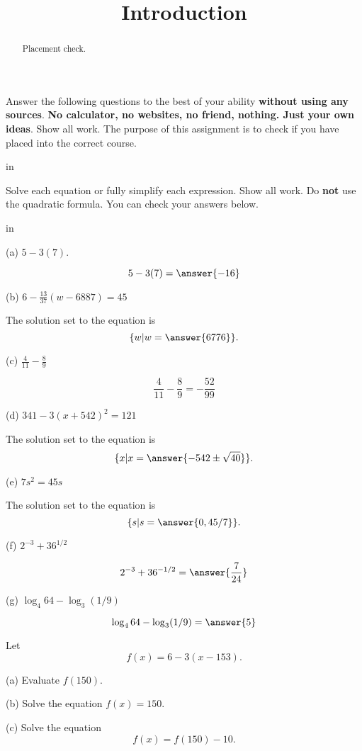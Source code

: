 \documentclass{ximera}
\title{Introduction}
\newcommand{\pskip}{\vskip 0.1 in}
\begin{document}
\begin{abstract}
Placement check. 
\end{abstract}
\maketitle


Answer the following questions to the best of your ability {\bf without using any sources}. {\bf No calculator, no websites, no friend, nothing. Just your own ideas}. Show all work. The purpose of this assignment is to check if you have placed into the correct course. 

\pskip

\begin{question}  \label{Q9df934gmmn}
Solve each equation or fully simplify each expression. Show all work. Do {\bf not} use the quadratic formula. You can check your answers below.

\pskip

(a) $ 5 - 3(7)$.  

\[
       5 - 3(7) =  \answer{-16}
\]

(b) $6 - \frac{13}{37} \left(  w - 6887 \right) = 45$

The solution set to the equation is
\[
    \{w | w= \answer{6776} \} .
\]

(c) $\frac{4}{11} - \frac{8}{9}$

\[
    \frac{4}{11} - \frac{8}{9} = -\frac{52}{99} 
\]

(d) $341 - 3 (x+542)^2 =121$

The solution set to the equation is
\[
       \{x | x= \answer{-542 \pm \sqrt{40}} \}.
\]

(e) $7s^2 = 45s $

The solution set to the equation is
\[
       \{s | s= \answer{0, 45/7} \}.
\]

(f) $2^{-3} + 36^{1/2}$

\[
     2^{-3} + 36^{-1/2} = \answer{\frac{7}{24}}
\]

(g) $\log_4 64 - \log_3 (1/9)$

\[
   \log_4 64 - \log_3 (1/9) = \answer{5}
\]


\end{question}

\begin{question}  \label{Q:9sdf85r3}
Let 
\[
   f(x) = 6 - 3(x-153) .
\]

(a) Evaluate $f(150)$.

(b) Solve the equation $f(x)=150$.

(c) Solve the equation
\[
      f(x) = f(150)-10 .
\]
\end{question}  
\end{document}
